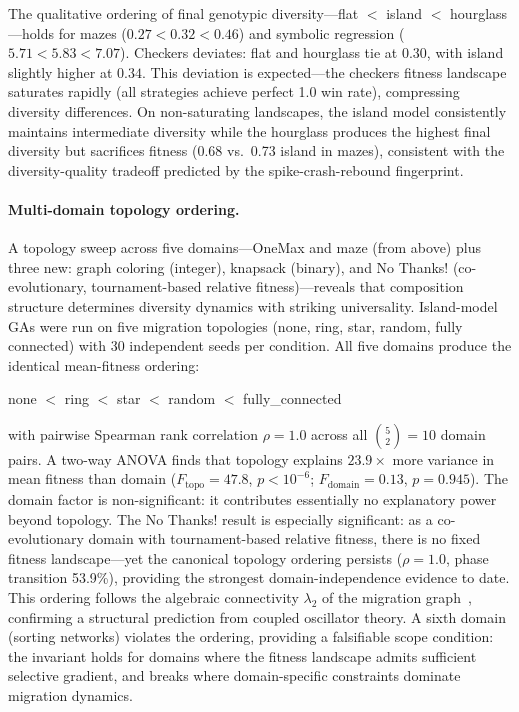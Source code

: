 \documentclass[sigconf,anonymous]{acmart}
\begin{document}
The qualitative ordering of final genotypic diversity---flat $<$ island $<$ hourglass---holds for mazes ($0.27 < 0.32 < 0.46$) and symbolic regression ($5.71 < 5.83 < 7.07$). Checkers deviates: flat and hourglass tie at $0.30$, with island slightly higher at $0.34$. This deviation is expected---the checkers fitness landscape saturates rapidly (all strategies achieve perfect 1.0 win rate), compressing diversity differences. On non-saturating landscapes, the island model consistently maintains intermediate diversity while the hourglass produces the highest final diversity but sacrifices fitness (0.68 vs.\ 0.73 island in mazes), consistent with the diversity-quality tradeoff predicted by the spike-crash-rebound fingerprint.

\paragraph{Multi-domain topology ordering.}
A topology sweep across five domains---OneMax and maze (from above) plus three new: graph coloring (integer), knapsack (binary), and No Thanks! (co-evolutionary, tournament-based relative fitness)---reveals that composition structure determines diversity dynamics with striking universality. Island-model GAs were run on five migration topologies (none, ring, star, random, fully connected) with 30 independent seeds per condition. All five domains produce the identical mean-fitness ordering:
\begin{center}
\small
none $<$ ring $<$ star $<$ random $<$ fully\_connected
\end{center}
\noindent with pairwise Spearman rank correlation $\rho = 1.0$ across all $\binom{5}{2} = 10$ domain pairs. A two-way ANOVA finds that topology explains $23.9\times$ more variance in mean fitness than domain ($F_{\mathrm{topo}} = 47.8$, $p < 10^{-6}$; $F_{\mathrm{domain}} = 0.13$, $p = 0.945$). The domain factor is non-significant: it contributes essentially no explanatory power beyond topology. The No Thanks! result is especially significant: as a co-evolutionary domain with tournament-based relative fitness, there is no fixed fitness landscape---yet the canonical topology ordering persists ($\rho = 1.0$, phase transition 53.9\%), providing the strongest domain-independence evidence to date. This ordering follows the algebraic connectivity $\lambda_2$ of the migration graph~\cite{sanz2026algebraic}, confirming a structural prediction from coupled oscillator theory. A sixth domain (sorting networks) violates the ordering, providing a falsifiable scope condition: the invariant holds for domains where the fitness landscape admits sufficient selective gradient, and breaks where domain-specific constraints dominate migration dynamics.
\end{document}
